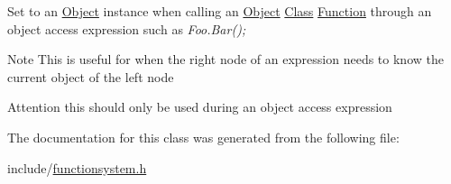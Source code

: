 Set to an \hyperlink{classObject}{Object} instance when calling an \hyperlink{classObject}{Object} \hyperlink{classClass}{Class} \hyperlink{classFunction}{Function} through an object access expression such as {\itshape Foo.\+Bar();} \begin{DoxyNote}{Note}
This is useful for when the right node of an expression needs to know the current object of the left node 
\end{DoxyNote}
\begin{DoxyAttention}{Attention}
this should only be used during an object access expression 
\end{DoxyAttention}


The documentation for this class was generated from the following file\+:\begin{DoxyCompactItemize}
\item 
include/\hyperlink{functionsystem_8h}{functionsystem.\+h}\end{DoxyCompactItemize}
